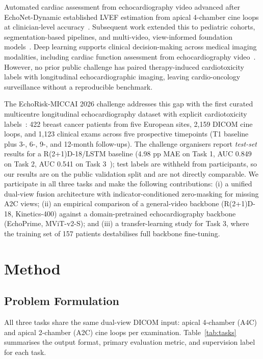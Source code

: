 \documentclass[runningheads]{llncs}
\begin{document}
Automated cardiac assessment from echocardiography video advanced after EchoNet-Dynamic established LVEF estimation from apical 4-chamber cine loops at clinician-level accuracy~\cite{ref_echonet}. Subsequent work extended this to pediatric cohorts, segmentation-based pipelines, and multi-video, view-informed foundation models~\cite{ref_echonet_pediatric,ref_echoprime}. Deep learning supports clinical decision-making across medical imaging modalities, including cardiac function assessment from echocardiography video~\cite{ref_echonet,ref_echoprime}. However, no prior public challenge has paired therapy-induced cardiotoxicity labels with longitudinal echocardiographic imaging, leaving cardio-oncology surveillance without a reproducible benchmark.

The EchoRisk-MICCAI 2026 challenge addresses this gap with the first curated multicentre longitudinal echocardiography dataset with explicit cardiotoxicity labels~\cite{ref_echorisk}: 422 breast cancer patients from five European sites, 2,159 DICOM cine loops, and 1,123 clinical exams across five prospective timepoints (T1 baseline plus 3-, 6-, 9-, and 12-month follow-ups). The challenge organisers report \emph{test-set} results for a R(2+1)D-18/LSTM baseline (4.98 pp MAE on Task 1, AUC 0.849 on Task 2, AUC 0.541 on Task 3~\cite{ref_echorisk}); test labels are withheld from participants, so our results are on the public validation split and are not directly comparable. We participate in all three tasks and make the following contributions: (i) a unified dual-view fusion architecture with indicator-conditioned zero-masking for missing A2C views; (ii) an empirical comparison of a general-video backbone (R(2+1)D-18, Kinetics-400) against a domain-pretrained echocardiography backbone (EchoPrime, MViT-v2-S); and (iii) a transfer-learning study for Task 3, where the training set of 157 patients destabilises full backbone fine-tuning.

\section{Method}

\subsection{Problem Formulation}

All three tasks share the same dual-view DICOM input: apical 4-chamber (A4C) and apical 2-chamber (A2C) cine loops per examination. Table~\ref{tab:tasks} summarises the output format, primary evaluation metric, and supervision label for each task.
\end{document}
